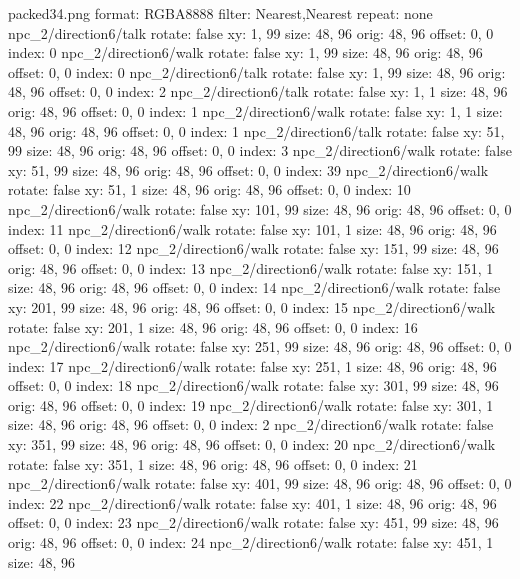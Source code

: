 packed34.png
format: RGBA8888
filter: Nearest,Nearest
repeat: none
npc_2/direction6/talk
  rotate: false
  xy: 1, 99
  size: 48, 96
  orig: 48, 96
  offset: 0, 0
  index: 0
npc_2/direction6/walk
  rotate: false
  xy: 1, 99
  size: 48, 96
  orig: 48, 96
  offset: 0, 0
  index: 0
npc_2/direction6/talk
  rotate: false
  xy: 1, 99
  size: 48, 96
  orig: 48, 96
  offset: 0, 0
  index: 2
npc_2/direction6/talk
  rotate: false
  xy: 1, 1
  size: 48, 96
  orig: 48, 96
  offset: 0, 0
  index: 1
npc_2/direction6/walk
  rotate: false
  xy: 1, 1
  size: 48, 96
  orig: 48, 96
  offset: 0, 0
  index: 1
npc_2/direction6/talk
  rotate: false
  xy: 51, 99
  size: 48, 96
  orig: 48, 96
  offset: 0, 0
  index: 3
npc_2/direction6/walk
  rotate: false
  xy: 51, 99
  size: 48, 96
  orig: 48, 96
  offset: 0, 0
  index: 39
npc_2/direction6/walk
  rotate: false
  xy: 51, 1
  size: 48, 96
  orig: 48, 96
  offset: 0, 0
  index: 10
npc_2/direction6/walk
  rotate: false
  xy: 101, 99
  size: 48, 96
  orig: 48, 96
  offset: 0, 0
  index: 11
npc_2/direction6/walk
  rotate: false
  xy: 101, 1
  size: 48, 96
  orig: 48, 96
  offset: 0, 0
  index: 12
npc_2/direction6/walk
  rotate: false
  xy: 151, 99
  size: 48, 96
  orig: 48, 96
  offset: 0, 0
  index: 13
npc_2/direction6/walk
  rotate: false
  xy: 151, 1
  size: 48, 96
  orig: 48, 96
  offset: 0, 0
  index: 14
npc_2/direction6/walk
  rotate: false
  xy: 201, 99
  size: 48, 96
  orig: 48, 96
  offset: 0, 0
  index: 15
npc_2/direction6/walk
  rotate: false
  xy: 201, 1
  size: 48, 96
  orig: 48, 96
  offset: 0, 0
  index: 16
npc_2/direction6/walk
  rotate: false
  xy: 251, 99
  size: 48, 96
  orig: 48, 96
  offset: 0, 0
  index: 17
npc_2/direction6/walk
  rotate: false
  xy: 251, 1
  size: 48, 96
  orig: 48, 96
  offset: 0, 0
  index: 18
npc_2/direction6/walk
  rotate: false
  xy: 301, 99
  size: 48, 96
  orig: 48, 96
  offset: 0, 0
  index: 19
npc_2/direction6/walk
  rotate: false
  xy: 301, 1
  size: 48, 96
  orig: 48, 96
  offset: 0, 0
  index: 2
npc_2/direction6/walk
  rotate: false
  xy: 351, 99
  size: 48, 96
  orig: 48, 96
  offset: 0, 0
  index: 20
npc_2/direction6/walk
  rotate: false
  xy: 351, 1
  size: 48, 96
  orig: 48, 96
  offset: 0, 0
  index: 21
npc_2/direction6/walk
  rotate: false
  xy: 401, 99
  size: 48, 96
  orig: 48, 96
  offset: 0, 0
  index: 22
npc_2/direction6/walk
  rotate: false
  xy: 401, 1
  size: 48, 96
  orig: 48, 96
  offset: 0, 0
  index: 23
npc_2/direction6/walk
  rotate: false
  xy: 451, 99
  size: 48, 96
  orig: 48, 96
  offset: 0, 0
  index: 24
npc_2/direction6/walk
  rotate: false
  xy: 451, 1
  size: 48, 96
